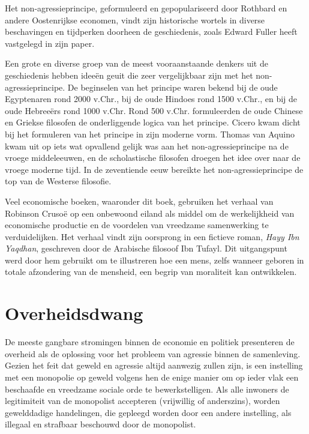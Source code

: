 Het non-agressieprincipe, geformuleerd en gepopulariseerd door Rothbard en andere Oostenrijkse economen, vindt zijn historische wortels in diverse beschavingen en tijdperken doorheen de geschiedenis, zoals Edward Fuller heeft vastgelegd in zijn paper.

\begin{blockquotebox}
Een grote en diverse groep van de meest vooraanstaande denkers uit de geschiedenis hebben ideeën geuit die zeer vergelijkbaar zijn met het non-agressieprincipe. De beginselen van het principe waren bekend bij de oude Egyptenaren rond 2000 v.Chr., bij de oude Hindoes rond 1500 v.Chr., en bij de oude Hebreeërs rond 1000 v.Chr. Rond 500 v.Chr. formuleerden de oude Chinese en Griekse filosofen de onderliggende logica van het principe. Cicero kwam dicht bij het formuleren van het principe in zijn moderne vorm. Thomas van Aquino kwam uit op iets wat opvallend gelijk was aan het non-agressieprincipe na de vroege middeleeuwen, en de scholastische filosofen droegen het idee over naar de vroege moderne tijd. In de zeventiende eeuw bereikte het non-agressieprincipe de top van de Westerse filosofie.\footnotemark
\end{blockquotebox}
\autocite{180}

Veel economische boeken, waaronder dit boek, gebruiken het verhaal van Robinson Crusoë op een onbewoond eiland als middel om de werkelijkheid van economische productie en de voordelen van vreedzame samenwerking te verduidelijken. Het verhaal vindt zijn oorsprong in een fictieve roman, \emph{Hayy Ibn Yaqdhan}, geschreven door de Arabische filosoof Ibn Tufayl. Dit uitgangspunt werd door hem gebruikt om te illustreren hoe een mens, zelfs wanneer geboren in totale afzondering van de mensheid, een begrip van moraliteit kan ontwikkelen.

\hypertarget{overheidsdwang}{%
\section{Overheidsdwang}\label{overheidsdwang}}

De meeste gangbare stromingen binnen de economie en politiek presenteren de overheid als de oplossing voor het probleem van agressie binnen de samenleving. Gezien het feit dat geweld en agressie altijd aanwezig zullen zijn, is een instelling met een monopolie op geweld volgens hen de enige manier om op ieder vlak een beschaafde en vreedzame sociale orde te bewerkstelligen. Als alle inwoners de legitimiteit van de monopolist accepteren (vrijwillig of anderszins), worden gewelddadige handelingen, die gepleegd worden door een andere instelling, als illegaal en strafbaar beschouwd door de monopolist.

